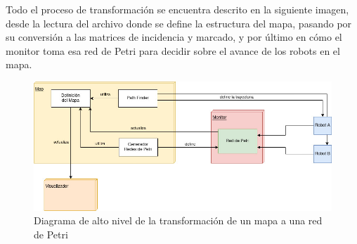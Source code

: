 Todo el proceso de transformación se encuentra descrito en la siguiente imagen, desde la lectura del archivo donde se define la estructura del mapa, pasando por su conversión a las matrices de incidencia y marcado, y por último en cómo el monitor toma esa red de Petri para decidir sobre el avance de los robots en el mapa.

\begin{figure}[H]
   \centering
   \includegraphics[width=1.0\linewidth]{images/diagrama_clase_monitor.jpg}
   \caption{Diagrama de alto nivel de la transformación de un mapa a una red de Petri}
   \label{fig:mapa_to_rdp}
\end{figure}